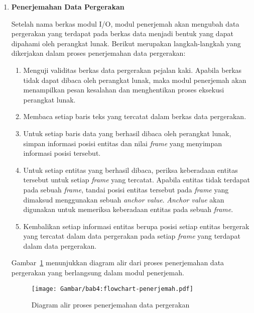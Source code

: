 \begin{enumerate}
    \item \textbf{Penerjemahan Data Pergerakan}
    
    Setelah nama berkas  modul I/O, modul penerjemah akan mengubah data pergerakan yang terdapat pada berkas data menjadi bentuk yang dapat dipahami oleh perangkat lunak. Berikut merupakan langkah-langkah yang dikerjakan dalam proses penerjemahan data pergerakan:
    
    \begin{enumerate}
        \item Menguji validitas berkas data pergerakan pejalan kaki. Apabila berkas tidak dapat dibaca oleh perangkat lunak, maka modul penerjemah akan menampilkan pesan kesalahan dan menghentikan proses eksekusi perangkat lunak.
        
        \item Membaca setiap baris teks yang tercatat dalam berkas data pergerakan.
    
        \item Untuk setiap baris data yang berhasil dibaca oleh perangkat lunak, simpan informasi posisi entitas dan nilai \textit{frame} yang menyimpan informasi posisi tersebut.
        
        \item Untuk setiap entitas yang berhasil dibaca, periksa keberadaan entitas tersebut untuk setiap \textit{frame} yang tercatat. Apabila entitas tidak terdapat pada sebuah \textit{frame}, tandai posisi entitas tersebut pada \textit{frame} yang dimaksud menggunakan sebuah \textit{anchor value}. \textit{Anchor value} akan digunakan untuk memeriksa keberadaan entitas pada sebuah \textit{frame}.
        
        \item Kembalikan setiap informasi entitas berupa posisi setiap entitas bergerak yang tercatat dalam data pergerakan pada setiap \textit{frame} yang terdapat dalam data pergerakan.
    \end{enumerate}
    
    Gambar~\ref{bab4:flowchart-penerjemah} menunjukkan diagram alir dari proses penerjemahan data pergerakan yang berlangsung dalam modul penerjemah.
    
    \begin{figure}[h]
        \centering
        \texttt{[image: Gambar/bab4:flowchart-penerjemah.pdf]}
        \caption{Diagram alir proses penerjemahan data pergerakan}
        \label{bab4:flowchart-penerjemah}
    \end{figure}


\end{enumerate}
